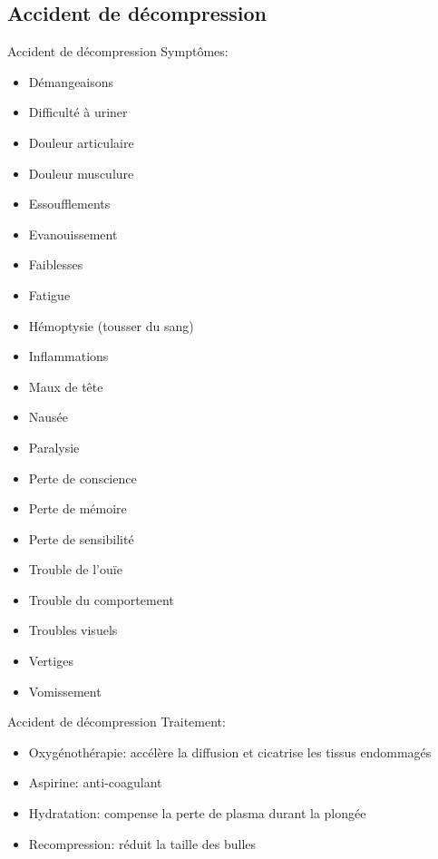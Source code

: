 \subsection{Accident de décompression}

\begin{frame}{Accident de décompression}  
	Symptômes:
	\begin{multicols}{2}
		\begin{itemize}
			\item Démangeaisons
			\item Difficulté à uriner
			\item Douleur articulaire
			\item Douleur musculure
			\item Essoufflements
			\item Evanouissement
			\item Faiblesses
			\item Fatigue
			\item Hémoptysie (tousser du sang)
			\item Inflammations
			\item Maux de tête
			\item Nausée
			\item Paralysie
			\item Perte de conscience
			\item Perte de mémoire
			\item Perte de sensibilité
			\item Trouble de l'ouïe
			\item Trouble du comportement
			\item Troubles visuels
			\item Vertiges
			\item Vomissement
		\end{itemize}
	\end{multicols}
\end{frame}

\begin{frame}{Accident de décompression}
	Traitement:
	\begin{itemize}
		\item Oxygénothérapie: accélère la diffusion et cicatrise les tissus endommagés
		\item Aspirine: anti-coagulant
		\item Hydratation: compense la perte de plasma durant la plongée
		\item Recompression: réduit la taille des bulles
	\end{itemize}
\end{frame}

